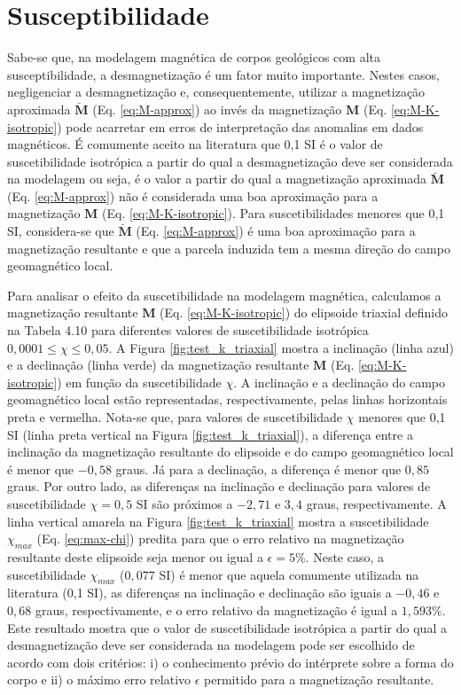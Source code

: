 \section{Susceptibilidade}

Sabe-se que, na modelagem magnética de corpos geológicos com alta susceptibilidade, a desmagnetização é um fator muito importante. Nestes casos, negligenciar a desmagnetização e, consequentemente, utilizar a magnetização aproximada $\breve{\mathbf{M}}$ (Eq. \ref{eq:M-approx}) ao invés da magnetização $\mathbf{M}$ (Eq. \ref{eq:M-K-isotropic}) pode acarretar em erros de interpretação das anomalias em dados magnéticos. É comumente aceito na literatura que 0,1 SI é o valor de suscetibilidade isotrópica a partir do qual a desmagnetização deve ser considerada na modelagem ou seja, é o valor a partir do qual a magnetização aproximada $\breve{\mathbf{M}}$ (Eq. \ref{eq:M-approx}) não é considerada uma boa aproximação para a magnetização $\mathbf{M}$ (Eq. \ref{eq:M-K-isotropic}). Para suscetibilidades menores que 0,1 SI, considera-se que $\breve{\mathbf{M}}$ (Eq. \ref{eq:M-approx}) é uma boa aproximação para a magnetização resultante e que a parcela induzida tem a mesma direção do campo geomagnético local.

Para analisar o efeito da suscetibilidade na modelagem magnética, calculamos a magnetização resultante $\mathbf{M}$ (Eq. \ref{eq:M-K-isotropic}) do elipsoide triaxial definido na Tabela 4.10 para diferentes valores de suscetibilidade isotrópica $0,0001 \le \chi \le 0,05$. A Figura \ref{fig:test_k_triaxial} mostra a inclinação (linha azul) e a declinação (linha verde) da magnetização resultante $\mathbf{M}$ (Eq. \ref{eq:M-K-isotropic}) em função da suscetibilidade $\chi$. A inclinação e a declinação do campo geomagnético local estão representadas, respectivamente, pelas linhas horizontais preta e vermelha. Nota-se que, para valores de suscetibilidade $\chi$ menores que 0,1 SI (linha preta vertical na Figura \ref{fig:test_k_triaxial}), a diferença entre a inclinação da magnetização resultante do elipsoide e do campo geomagnético local é menor que $-0,58$ graus. Já para a declinação, a diferença é menor que $0,85$ graus. Por outro lado, as diferenças na inclinação e declinação para valores de suscetibilidade $\chi = 0,5$ SI são próximos a $-2,71$ e $3,4$ graus, respectivamente. A linha vertical amarela na Figura \ref{fig:test_k_triaxial} mostra a suscetibilidade $\chi_{max}$ (Eq. \ref{eq:max-chi}) predita para que o erro relativo na magnetização resultante deste elipsoide seja menor ou igual a $\epsilon = 5\%$. Neste caso, a suscetibilidade $\chi_{max}$ ($0,077$ SI) é menor que aquela comumente utilizada na literatura (0,1 SI), as diferenças na inclinação e declinação são iguais a $-0,46$ e $0,68$ graus, respectivamente, e o erro relativo da magnetização é igual a $1,593\%$. Este resultado mostra que o valor de suscetibilidade isotrópica a partir do qual a desmagnetização deve ser considerada na modelagem pode ser escolhido de acordo com dois critérios: i) o conhecimento prévio do intérprete sobre a forma do corpo e ii) o máximo erro relativo $\epsilon$ permitido para a magnetização resultante.

